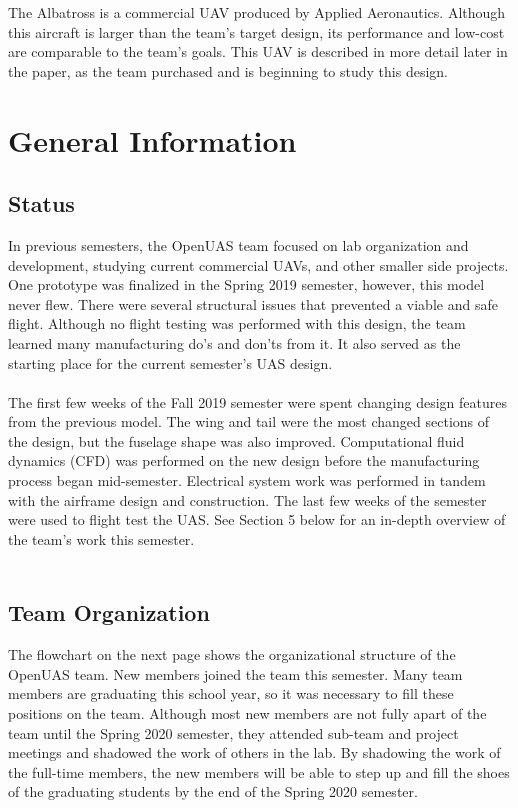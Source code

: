\documentclass{article}
\begin{document}
\noindent The Albatross is a commercial UAV produced by Applied Aeronautics. Although this aircraft is larger than the team's target design, its performance and low-cost are comparable to the team's goals. This UAV is described in more detail later in the paper, as the team purchased and is beginning to study this design. \\


\section{General Information}

\subsection{Status}
In previous semesters, the OpenUAS team focused on lab organization and development, studying current commercial UAVs, and other smaller side projects. One prototype was finalized in the Spring 2019 semester, however, this model never flew. There were several structural issues that prevented a viable and safe flight. Although no flight testing was performed with this design, the team learned many manufacturing do's and don'ts from it. It also served as the starting place for the current semester's UAS design.\\\\
The first few weeks of the Fall 2019 semester were spent changing design features from the previous model. The wing and tail were the most changed sections of the design, but the fuselage shape was also improved. Computational fluid dynamics (CFD) was performed on the new design before the manufacturing process began mid-semester. Electrical system work was performed in tandem with the airframe design and construction. The last few weeks of the semester were used to flight test the UAS. See Section 5 below for an in-depth overview of the team's work this semester. \\\\

\subsection{Team Organization}
The flowchart on the next page shows the organizational structure of the OpenUAS team. New members joined the team this semester. Many team members are graduating this school year, so it was necessary to fill these positions on the team. Although most new members are not fully apart of the team until the Spring 2020 semester, they attended sub-team and project meetings and shadowed the work of others in the lab. By shadowing the work of the full-time members, the new members will be able to step up and fill the shoes of the graduating students by the end of the Spring 2020 semester. \\\\
\end{document}
